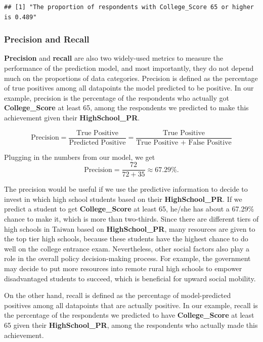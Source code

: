 \documentclass[
]{article}
\begin{document}
\begin{verbatim}
## [1] "The proportion of respondents with College_Score 65 or higher is 0.489"
\end{verbatim}

\subsubsection{Precision and Recall}

\textbf{Precision} and \textbf{recall} are also two widely-used metrics
to measure the performance of the prediction model, and most
importantly, they do not depend much on the proportions of data
categories. Precision is defined as the percentage of true positives
among all datapoints the model predicted to be positive. In our example,
precision is the percentage of the respondents who actually got
\textbf{College\_Score} at least 65, among the respondents we predicted
to make this achievement given their \textbf{HighSchool\_PR}.

\[\text{Precision} = \dfrac{\text{True Positive}}{\text{Predicted Positive}} = \dfrac{\text{True Positive}}{\text{True Positive + False Positive}}\]

Plugging in the numbers from our model, we get
\[\text{Precision} = \dfrac{72}{72+35} \approx 67.29\%.\]

The precision would be useful if we use the predictive information to
decide to invest in which high school students based on their
\textbf{HighSchool\_PR}. If we predict a student to get
\textbf{College\_Score} at least 65, he/she has about a 67.29\% chance
to make it, which is more than two-thirds. Since there are different
tiers of high schools in Taiwan based on \textbf{HighSchool\_PR}, many
resources are given to the top tier high schools, because these students
have the highest chance to do well on the college entrance exam.
Nevertheless, other social factors also play a role in the overall
policy decision-making process. For example, the government may decide
to put more resources into remote rural high schools to empower
disadvantaged students to succeed, which is beneficial for upward social
mobility.

On the other hand, recall is defined as the percentage of
model-predicted positives among all datapoints that are actually
positive. In our example, recall is the percentage of the respondents we
predicted to have \textbf{College\_Score} at least 65 given their
\textbf{HighSchool\_PR}, among the respondents who actually made this
achievement.
\end{document}
